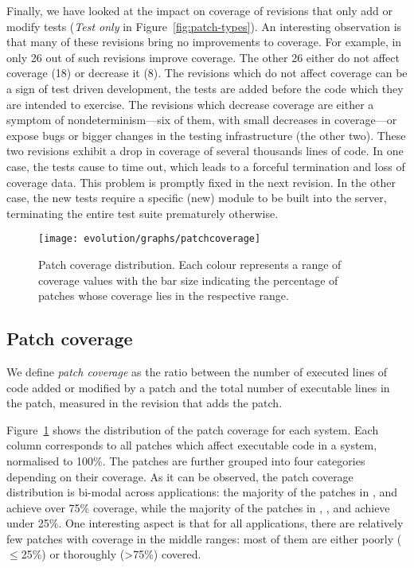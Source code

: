 Finally, we have looked at the impact on coverage of revisions that
only add or modify tests (\textit{Test only} in
Figure~\ref{fig:patch-types}).  An interesting observation is that
many of these revisions bring no improvements to coverage. For
example, in \lighttpdtwo only 26 out of \lighttpdtwoOnlyTestRevs such
revisions improve coverage. The other 26 either do not affect coverage
(18) or decrease it (8).  The revisions which do not affect coverage
can be a sign of test driven development, \ie the tests are added
before the code which they are intended to exercise. The revisions
which decrease coverage are either a symptom of nondeterminism---six
of them, with small decreases in coverage---or expose bugs or bigger
changes in the testing infrastructure (the other two).  These two
revisions exhibit a drop in coverage of several thousands lines of
code. In one case, the tests cause \lighttpdtwo to time out, which leads
to a forceful termination and loss of coverage data.  This problem is
promptly fixed in the next revision.  In the other case, the new tests
require a specific (new) module to be built into the server,
terminating the entire test suite prematurely otherwise.

\begin{figure}[t]
\texttt{[image: evolution/graphs/patchcoverage]}
\caption{Patch coverage distribution. Each colour represents a range of
coverage values with the bar size indicating the percentage of patches whose
coverage lies in the respective range.}
\label{fig:patch-coverage}
\end{figure}

\subsection{Patch coverage}
\label{sec:pcoverage}
\label{sec:lpcoverage}


We define {\em patch coverage} as the ratio between the number of
executed lines of code added or modified by a patch and the total
number of executable lines in the patch, measured in the revision that
adds the patch.

Figure~\ref{fig:patch-coverage} shows the distribution of the patch coverage for each
system. Each column corresponds to all patches which affect executable
code in a system, normalised to 100\%. The patches are further grouped into
four categories depending on their coverage.
As it can be observed, the patch coverage distribution is
bi-modal across applications: the majority of the patches
in \git, \memcached and \zeromq achieve over 75\% coverage, while the
majority of the patches in \beanstalkd, \binutils, \lighttpdtwo and \redis achieve
under 25\%.  One interesting aspect is that for all applications,
there are relatively few patches with coverage in the middle ranges:
most of them are either poorly ($\le$25\%) or thoroughly (\textgreater75\%)
covered.

